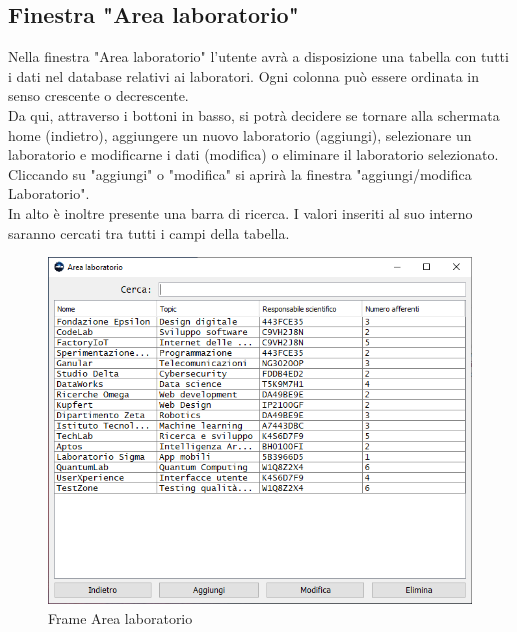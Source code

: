         \subsection {Finestra "Area laboratorio"}
            Nella finestra "Area laboratorio" l'utente avrà a disposizione una tabella con tutti i dati nel database relativi ai laboratori. Ogni colonna può essere ordinata in senso crescente o decrescente.\\
            Da qui, attraverso i bottoni in basso, si potrà decidere se tornare alla schermata home (indietro), aggiungere un nuovo laboratorio (aggiungi), selezionare un laboratorio e modificarne i dati (modifica) o eliminare il laboratorio selezionato. Cliccando su "aggiungi" o "modifica" si aprirà la finestra "aggiungi/modifica Laboratorio".\\
            In alto è inoltre presente una barra di ricerca. I valori inseriti al suo interno saranno cercati tra tutti i campi della tabella.
            \begin{figure}[htbp!]
                \centering
                    \vspace{2\baselineskip}
                    \includegraphics[width=0.9\linewidth]{Immagini/Frames/Frame Area/Frame Area laboratorio.png}
                \caption{Frame Area laboratorio}
                \label{fig:Frame Area laboratorio}
            \end{figure}

    \newpage

